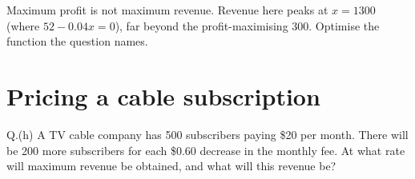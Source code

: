 \begin{pitfall}
Maximum profit is not maximum revenue. Revenue here peaks at $x=1300$
(where $52-0.04x=0$), far beyond the profit-maximising 300. Optimise the
function the question names.
\end{pitfall}

\section{Pricing a cable subscription}

\begin{question}{Q.(h)}
A TV cable company has 500 subscribers paying \$20 per month. There will be 200
more subscribers for each \$0.60 decrease in the monthly fee. At what rate will
maximum revenue be obtained, and what will this revenue be?
\end{question}


